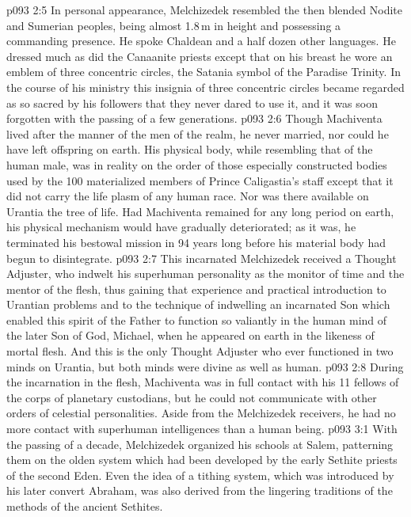 \vs p093 2:5 \pc In personal appearance, Melchizedek resembled the then blended Nodite and Sumerian peoples, being almost 1.8\,m in height and possessing a commanding presence. He spoke Chaldean and a half dozen other languages. He dressed much as did the Canaanite priests except that on his breast he wore an emblem of three concentric circles, the Satania symbol of the Paradise Trinity. In the course of his ministry this insignia of three concentric circles became regarded as so sacred by his followers that they never dared to use it, and it was soon forgotten with the passing of a few generations.
\vs p093 2:6 Though Machiventa lived after the manner of the men of the realm, he never married, nor could he have left offspring on earth. His physical body, while resembling that of the human male, was in reality on the order of those especially constructed bodies used by the 100 materialized members of Prince Caligastia’s staff except that it did not carry the life plasm of any human race. Nor was there available on Urantia the tree of life. Had Machiventa remained for any long period on earth, his physical mechanism would have gradually deteriorated; as it was, he terminated his bestowal mission in 94 years long before his material body had begun to disintegrate.
\vs p093 2:7 \pc This incarnated Melchizedek received a Thought Adjuster, who indwelt his superhuman personality as the monitor of time and the mentor of the flesh, thus gaining that experience and practical introduction to Urantian problems and to the technique of indwelling an incarnated Son which enabled this spirit of the Father to function so valiantly in the human mind of the later Son of God, Michael, when he appeared on earth in the likeness of mortal flesh. And this is the only Thought Adjuster who ever functioned in two minds on Urantia, but both minds were divine as well as human.
\vs p093 2:8 During the incarnation in the flesh, Machiventa was in full contact with his 11 fellows of the corps of planetary custodians, but he could not communicate with other orders of celestial personalities. Aside from the Melchizedek receivers, he had no more contact with superhuman intelligences than a human being.
\vs p093 3:1 With the passing of a decade, Melchizedek organized his schools at Salem, patterning them on the olden system which had been developed by the early Sethite priests of the second Eden. Even the idea of a tithing system, which was introduced by his later convert Abraham, was also derived from the lingering traditions of the methods of the ancient Sethites.
